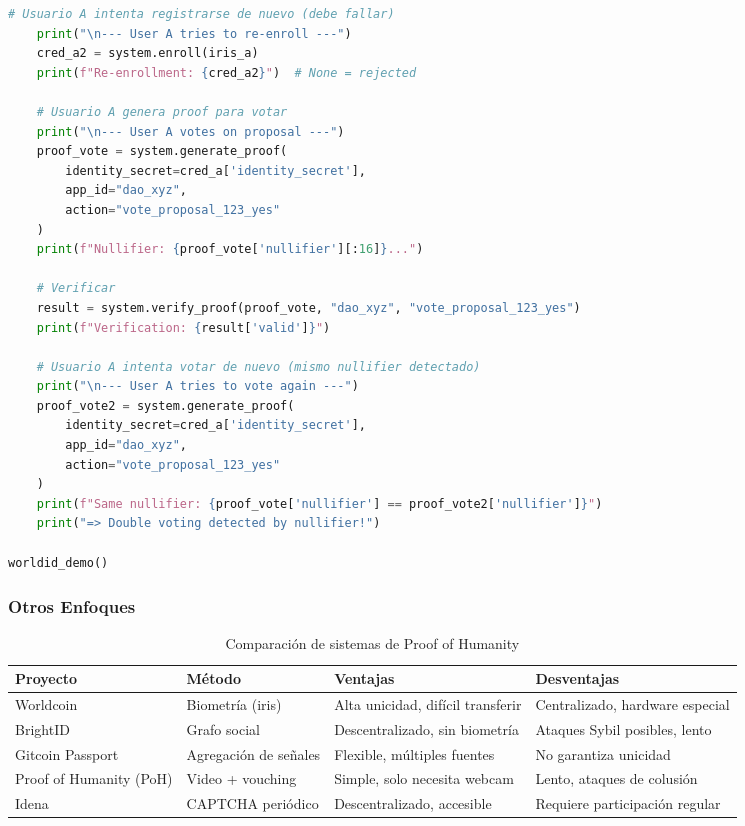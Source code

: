 \documentclass[11pt,a4paper,twoside]{book}
\theoremstyle{definition}
\theoremstyle{remark}
\begin{document}
\begin{lstlisting}[language=Python, caption={Worldcoin-style Proof of Humanity (conceptual)}]
    # Usuario A intenta registrarse de nuevo (debe fallar)
    print("\n--- User A tries to re-enroll ---")
    cred_a2 = system.enroll(iris_a)
    print(f"Re-enrollment: {cred_a2}")  # None = rejected
    
    # Usuario A genera proof para votar
    print("\n--- User A votes on proposal ---")
    proof_vote = system.generate_proof(
        identity_secret=cred_a['identity_secret'],
        app_id="dao_xyz",
        action="vote_proposal_123_yes"
    )
    print(f"Nullifier: {proof_vote['nullifier'][:16]}...")
    
    # Verificar
    result = system.verify_proof(proof_vote, "dao_xyz", "vote_proposal_123_yes")
    print(f"Verification: {result['valid']}")
    
    # Usuario A intenta votar de nuevo (mismo nullifier detectado)
    print("\n--- User A tries to vote again ---")
    proof_vote2 = system.generate_proof(
        identity_secret=cred_a['identity_secret'],
        app_id="dao_xyz",
        action="vote_proposal_123_yes"
    )
    print(f"Same nullifier: {proof_vote['nullifier'] == proof_vote2['nullifier']}")
    print("=> Double voting detected by nullifier!")

worldid_demo()
\end{lstlisting}

\subsubsection{Otros Enfoques}

\begin{table}[htbp]
\centering
\small
\begin{tabular}{lp{3cm}p{3cm}p{3cm}}
\toprule
\textbf{Proyecto} & \textbf{Método} & \textbf{Ventajas} & \textbf{Desventajas} \\
\midrule
Worldcoin & Biometría (iris) & Alta unicidad, difícil transferir & Centralizado, hardware especial \\
BrightID & Grafo social & Descentralizado, sin biometría & Ataques Sybil posibles, lento \\
Gitcoin Passport & Agregación de señales & Flexible, múltiples fuentes & No garantiza unicidad \\
Proof of Humanity (PoH) & Video + vouching & Simple, solo necesita webcam & Lento, ataques de colusión \\
Idena & CAPTCHA periódico & Descentralizado, accesible & Requiere participación regular \\
\bottomrule
\end{tabular}
\caption{Comparación de sistemas de Proof of Humanity}
\end{table}
\end{document}
